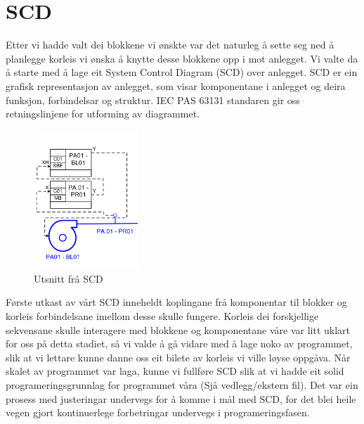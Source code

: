 \section{SCD}
\thispagestyle{fancy}

Etter vi hadde valt dei blokkene vi ønskte var det naturleg å sette seg ned å planlegge korleis vi ønska å knytte desse blokkene opp i mot anlegget. 
Vi valte da å starte med å lage eit System Control Diagram (SCD) over anlegget. 
SCD er ein grafisk representasjon av anlegget, som visar komponentane i anlegget og deira funksjon, forbindelsar og struktur. 
IEC PAS 63131 standaren gir oss retningslinjene for utforming av diagrammet.


\begin{figure}[htbp]
    \centering
    \includegraphics[width=0.35\textwidth]{Bilder/Visio_eksempel.png}
    \caption{Utsnitt frå SCD}\label{fig:SCD eksempel}    
\end{figure}


Første utkast av vårt SCD inneheldt koplingane frå komponentar til blokker og korleis forbindelsane imellom desse skulle fungere. 
Korleis dei forskjellige sekvensane skulle interagere med blokkene og komponentane våre var litt uklart for oss på detta stadiet,
så vi valde å gå vidare med å lage noko av programmet, slik at vi lettare kunne danne oss eit bilete av korleis vi ville løyse oppgåva.
Når skalet av programmet var laga, kunne vi fullføre SCD slik at vi hadde eit solid programeringsgrunnlag for programmet våra (Sjå vedlegg/ekstern fil). 
Det var ein prosess med justeringar undervegs for å komme i mål med SCD, for det blei heile vegen gjort kontinuerlege forbetringar undervegs i programeringsfasen. 



\newpage